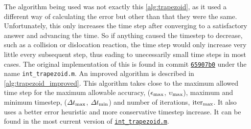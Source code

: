 The algorithm being used was not exactly this \cref{alg:trapezoid}, as it used a different way of calculating the error but other than that they were the same. Unfortunately, this only increases the time step after converging to a satisfactory answer and advancing the time. So if anything caused the timestep to decrease, such as a collision or dislocation reaction, the time step would only increase very little every subsequent step, thus eading to unecessarily small time steps in most cases. The original implementation of this is found in commit \href{https://github.com/TarletonGroup/EasyDD/blob/780a6c41b35687b443d3241674af7393d2140639/int_trapezoid.m}{\texttt{65907b0}} under the name \texttt{int\_trapezoid.m}. An improved algorithm is described in \cref{alg:trapezoid_improved}. This algorithm takes close to the maximum allowed time step for the maximum allowable accuracy, ($\epsilon_{\textrm{max}}$, $\upsilon_{\textrm{max}}$), maximum and minimum timestep, ($\Delta t_{\textrm{max}}$, $\Delta t_{\textrm{min}}$) and number of iterations, $\textrm{iter}_{\textrm{max}}$. It also uses a better error heuristic and more conservative timestep increase. It can be found in the most current version of \href{https://github.com/TarletonGroup/EasyDD/blob/master/src/int_trapezoid.m}{\texttt{int\_trapezoid.m}}.
